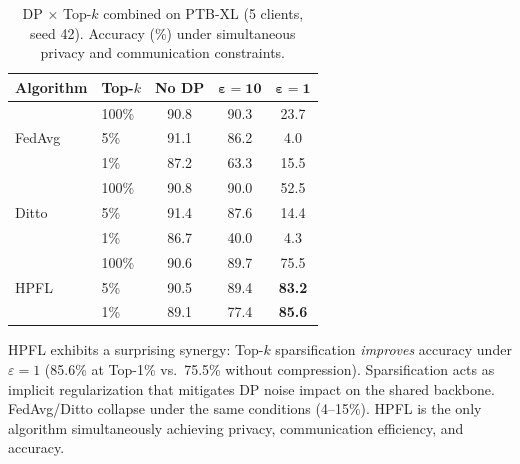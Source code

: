 \documentclass[conference,a4paper]{IEEEtran}
\begin{document}
\begin{table}[htbp]
\centering
\caption{DP $\times$ Top-$k$ combined on PTB-XL (5 clients, seed 42). Accuracy (\%) under simultaneous privacy and communication constraints.}
\label{tab:dp_topk}
\small
\begin{tabular}{llccc}
\toprule
\textbf{Algorithm} & \textbf{Top-$k$} & \textbf{No DP} & $\boldsymbol{\varepsilon{=}10}$ & $\boldsymbol{\varepsilon{=}1}$ \\
\midrule
\multirow{3}{*}{FedAvg} & 100\% & 90.8 & 90.3 & 23.7 \\
 & 5\% & 91.1 & 86.2 & 4.0 \\
 & 1\% & 87.2 & 63.3 & 15.5 \\
\midrule
\multirow{3}{*}{Ditto} & 100\% & 90.8 & 90.0 & 52.5 \\
 & 5\% & 91.4 & 87.6 & 14.4 \\
 & 1\% & 86.7 & 40.0 & 4.3 \\
\midrule
\multirow{3}{*}{HPFL} & 100\% & 90.6 & 89.7 & 75.5 \\
 & 5\% & 90.5 & 89.4 & \textbf{83.2} \\
 & 1\% & 89.1 & 77.4 & \textbf{85.6} \\
\bottomrule
\end{tabular}

\vspace{1mm}
\footnotesize{HPFL exhibits a surprising synergy: Top-$k$ sparsification \textit{improves} accuracy under $\varepsilon{=}1$ (85.6\% at Top-1\% vs.\ 75.5\% without compression). Sparsification acts as implicit regularization that mitigates DP noise impact on the shared backbone. FedAvg/Ditto collapse under the same conditions (4--15\%). HPFL is the only algorithm simultaneously achieving privacy, communication efficiency, and accuracy.}
\end{table}

\end{document}
